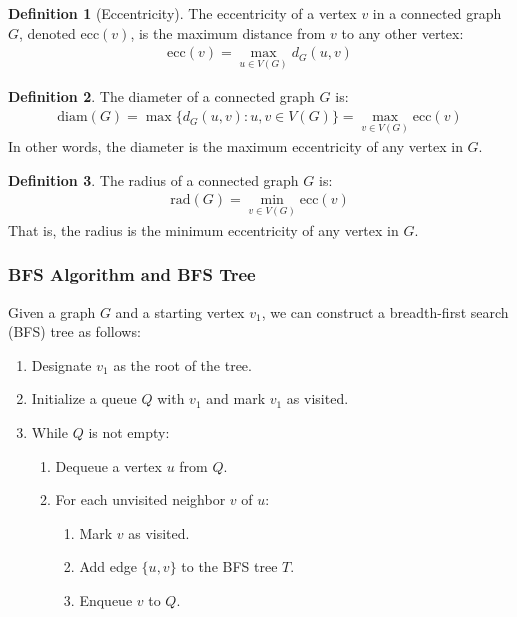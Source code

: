 \documentclass{article}
\theoremstyle{definition}
\newtheorem{definition}{Definition}
\begin{document}
\begin{definition}[Eccentricity]
The eccentricity of a vertex $v$ in a connected graph $G$, denoted $\text{ecc}(v)$, is the maximum distance from $v$ to any other vertex:
\begin{align*}
\text{ecc}(v) = \max_{u \in V(G)} d_G(u,v)
\end{align*}
\end{definition}

\begin{definition}
The diameter of a connected graph $G$ is:
\begin{align*}
\text{diam}(G) = \max\{d_G(u,v) : u,v \in V(G)\} = \max_{v \in V(G)} \text{ecc}(v)
\end{align*}
In other words, the diameter is the maximum eccentricity of any vertex in $G$.
\end{definition}
\begin{definition}
The radius of a connected graph $G$ is:
\begin{align*}
\text{rad}(G) = \min_{v \in V(G)} \text{ecc}(v)
\end{align*}
That is, the radius is the minimum eccentricity of any vertex in $G$.
\end{definition}
\subsubsection{BFS Algorithm and BFS Tree}

Given a graph $G$ and a starting vertex $v_1$, we can construct a breadth-first search (BFS) tree as follows:

\begin{enumerate}
\item Designate $v_1$ as the root of the tree.
\item Initialize a queue $Q$ with $v_1$ and mark $v_1$ as visited.
\item While $Q$ is not empty:
   \begin{enumerate}
   \item Dequeue a vertex $u$ from $Q$.
   \item For each unvisited neighbor $v$ of $u$:
      \begin{enumerate}
      \item Mark $v$ as visited.
      \item Add edge $\{u,v\}$ to the BFS tree $T$.
      \item Enqueue $v$ to $Q$.
      \end{enumerate}
   \end{enumerate}
\end{enumerate}
\end{document}
